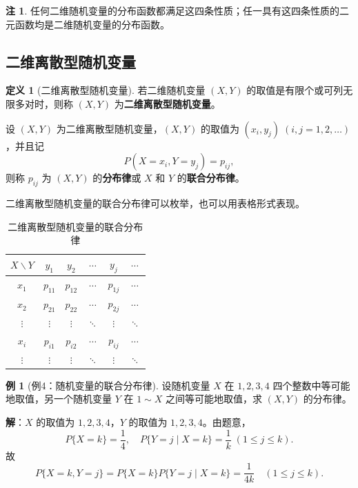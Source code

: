 \documentclass[11pt,a4paper]{report}
\theoremstyle{definition}
\newtheorem{definition}{定义}[chapter]
\newtheorem{example}{例}[chapter]
\newtheorem{note}{注}[chapter]
\begin{document}
\begin{note}
任何二维随机变量的分布函数都满足这四条性质；任一具有这四条性质的二元函数均是二维随机变量的分布函数。
\end{note}

\subsection{二维离散型随机变量}

\begin{definition}[二维离散型随机变量]
若二维随机变量 $(X,Y)$ 的取值是有限个或可列无限多对时，则称 $(X,Y)$ 为\textbf{二维离散型随机变量}。

设 $(X,Y)$ 为二维离散型随机变量，$(X,Y)$ 的取值为 $(x_i,y_j)\;(i,j=1,2,\dots)$，并且记
\[
P(X=x_i,Y=y_j)=p_{ij},
\]
则称 $p_{ij}$ 为 $(X,Y)$ 的\textbf{分布律}或 $X$ 和 $Y$ 的\textbf{联合分布律}。
\end{definition}

二维离散型随机变量的联合分布律可以枚举，也可以用表格形式表现。

\begin{table}[htbp]
\centering
\caption{二维离散型随机变量的联合分布律}
\begin{tabular}{@{}cccccc@{}}
\toprule
$X\backslash Y$ & $y_1$ & $y_2$ & $\cdots$ & $y_j$ & $\cdots$ \\
\midrule
$x_1$ & $p_{11}$ & $p_{12}$ & $\cdots$ & $p_{1j}$ & $\cdots$ \\
$x_2$ & $p_{21}$ & $p_{22}$ & $\cdots$ & $p_{2j}$ & $\cdots$ \\
$\vdots$ & $\vdots$ & $\vdots$ & $\ddots$ & $\vdots$ & $\ddots$ \\
$x_i$ & $p_{i1}$ & $p_{i2}$ & $\cdots$ & $p_{ij}$ & $\cdots$ \\
$\vdots$ & $\vdots$ & $\vdots$ & $\ddots$ & $\vdots$ & $\ddots$ \\
\bottomrule
\end{tabular}
\end{table}

\begin{example}[例4：随机变量的联合分布律]
设随机变量 $X$ 在 $1,2,3,4$ 四个整数中等可能地取值，另一个随机变量 $Y$ 在 $1\sim X$ 之间等可能地取值，求 $(X,Y)$ 的分布律。
\end{example}

\textbf{解}：$X$ 的取值为 $1,2,3,4$，$Y$ 的取值为 $1,2,3,4$。由题意，
\[
P\{X=k\}=\frac{1}{4},\quad P\{Y=j\mid X=k\}=\frac{1}{k}\;(1\leq j\leq k).
\]
故
\[
P\{X=k,Y=j\}=P\{X=k\}P\{Y=j\mid X=k\}=\frac{1}{4k}\quad(1\leq j\leq k).
\]
\end{document}
